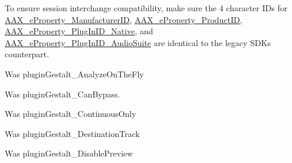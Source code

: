 \begin{DoxyRefList}
\label{a00802__porting_notes000040}%
%
 To ensure session interchange compatibility, make sure the 4 character IDs for \mbox{\hyperlink{a00674_a13e384f22825afd3db6d68395b79ce0da996465cca29a2a15291d1c788ac5728c}{AAX\+\_\+e\+Property\+\_\+\+Manufacturer\+ID}}, \mbox{\hyperlink{a00674_a13e384f22825afd3db6d68395b79ce0da3a41fcdff5af1a4fd19dcbca7b1ba6f3}{AAX\+\_\+e\+Property\+\_\+\+Product\+ID}}, \mbox{\hyperlink{a00674_a13e384f22825afd3db6d68395b79ce0da89ca3dd6e96895cda14976c1b1ceb826}{AAX\+\_\+e\+Property\+\_\+\+Plug\+In\+ID\+\_\+\+Native}}, and \mbox{\hyperlink{a00674_a13e384f22825afd3db6d68395b79ce0dad3344696b8298a8b254add3d039ea927}{AAX\+\_\+e\+Property\+\_\+\+Plug\+In\+ID\+\_\+\+Audio\+Suite}} are identical to the legacy SDK\textquotesingle{}s counterpart. 
\item[Member \mbox{\hyperlink{a00674_a13e384f22825afd3db6d68395b79ce0da9524773361ca8e712bef3547e8c46c9b}{AAX\+\_\+e\+Property\+\_\+\+Allow\+Preview\+Without\+Analysis}} ]\label{a00802__porting_notes000050}%
%
 Was plugin\+Gestalt\+\_\+\+Analyze\+On\+The\+Fly  
\item[Member \mbox{\hyperlink{a00674_a13e384f22825afd3db6d68395b79ce0da6819867a9e86913e59decf318416d755}{AAX\+\_\+e\+Property\+\_\+\+Can\+Bypass}} ]\label{a00802__porting_notes000046}%
%
 Was plugin\+Gestalt\+\_\+\+Can\+Bypass.  
\item[Member \mbox{\hyperlink{a00674_a13e384f22825afd3db6d68395b79ce0da95054276be8782d93437cd74669366d0}{AAX\+\_\+e\+Property\+\_\+\+Continuous\+Only}} ]\label{a00802__porting_notes000053}%
%
 Was plugin\+Gestalt\+\_\+\+Continuous\+Only  
\item[Member \mbox{\hyperlink{a00674_a13e384f22825afd3db6d68395b79ce0dadd8839e5678c8880215e318197cc8d3a}{AAX\+\_\+e\+Property\+\_\+\+Destination\+Track}} ]\label{a00802__porting_notes000051}%
%
 Was plugin\+Gestalt\+\_\+\+Destination\+Track  
\item[Member \mbox{\hyperlink{a00674_a13e384f22825afd3db6d68395b79ce0da854fdc19ab908b67aa3bc1f4262aa288}{AAX\+\_\+e\+Property\+\_\+\+Disable\+Preview}} ]\label{a00802__porting_notes000055}%
%
 Was plugin\+Gestalt\+\_\+\+Disable\+Preview  
\item[Member \mbox{\hyperlink{a00674_a13e384f22825afd3db6d68395b79ce0daaf6b47f0861af74ef5c5bb316481b97d}{AAX\+\_\+e\+Property\+\_\+\+Doesnt\+Incr\+Output\+Sample}} ]\label{a00802__porting_notes000056}%

\end{DoxyRefList}
